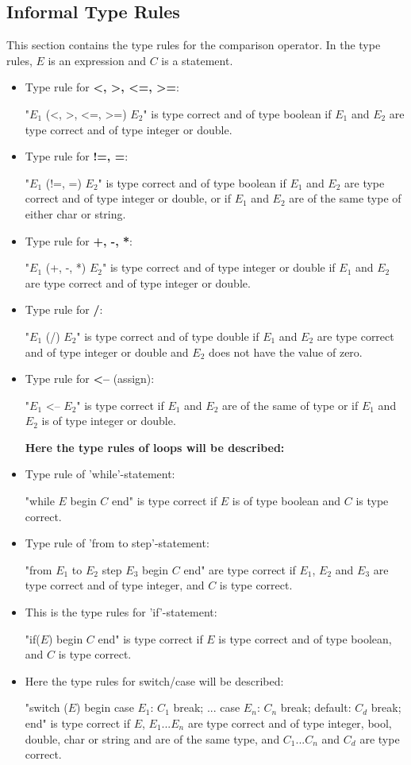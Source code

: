 \subsection{Informal Type Rules}
This section contains the type rules for the comparison operator. In the type rules, $E$ is an expression and $C$ is a statement.
\begin{itemize}
\item Type rule for \textbf{<, >, <=, >=}:

"$E_1$ (<, >, <=, >=) $E_2$" is type correct and of type boolean if $E_1$ and $E_2$ are type correct and of type integer or double.

\item Type rule for \textbf{!=, =}:

"$E_1$ (!=, =) $E_2$" is type correct and of type boolean if $E_1$ and $E_2$ are type correct and of type integer or double, or if $E_1$ and $E_2$ are of the same type of either char or string.

\item Type rule for \textbf{+, -, *}:

"$E_1$ (+, -, *) $E_2$" is type correct and of type integer or double if $E_1$ and $E_2$ are type correct and of type integer or double.

\item Type rule for \textbf{/}:

"$E_1$ (/) $E_2$" is type correct and of type double if $E_1$ and $E_2$ are type correct and of type integer or double and $E_2$ does not have the value of zero.

\item Type rule for \textbf{<--} (assign):

"$E_1$ <-- $E_2$" is type correct if $E_1$ and $E_2$ are of the same of type or if $E_1$ and $E_2$ is of type integer or double.

\textbf{Here the type rules of loops will be described:}

\item Type rule of 'while'-statement: 

"while $E$ begin $C$ end" is type correct if $E$ is of type boolean and $C$ is type correct.

\item Type rule of 'from to step'-statement: 

"from $E_1$ to $E_2$ step $E_3$ begin $C$ end" are type correct if $E_1$, $E_2$ and $E_3$ are type correct and of type integer, and $C$ is type correct.

\item This is the type rules for 'if'-statement:

"if($E$) begin $C$ end" is type correct if $E$ is type correct and of type boolean, and $C$ is type correct.

\item Here the type rules for switch/case will be described:

"switch ($E$) begin case $E_1$: $C_1$ break; ... case $E_n$: $C_n$ break; default: $C_d$ break; end" is type correct if $E$, $E_1$...$E_n$ are type correct and of type integer, bool, double, char or string and are of the same type, and $C_1$...$C_n$ and $C_d$ are type correct.
\end{itemize}
